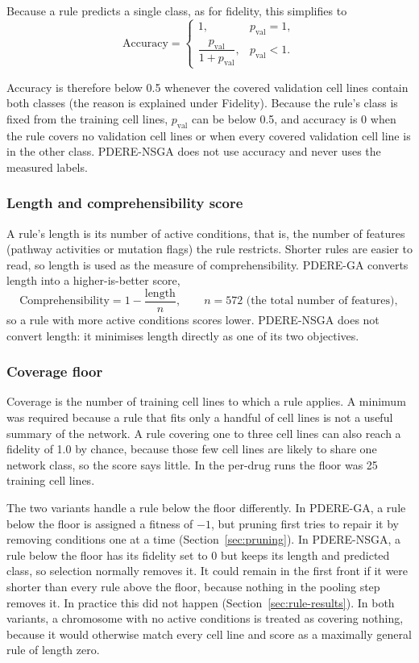 Because a rule predicts a single class, as for fidelity, this simplifies to
\[
  \text{Accuracy} =
  \begin{cases}
    1, & p_{\text{val}} = 1,\\[4pt]
    \dfrac{p_{\text{val}}}{1+p_{\text{val}}}, & p_{\text{val}} < 1.
  \end{cases}
\]

Accuracy is therefore below 0.5 whenever the covered validation cell lines contain both classes (the reason is explained under Fidelity). Because the rule's class is fixed from the training cell lines, $p_{\text{val}}$ can be below 0.5, and accuracy is 0 when the rule covers no validation cell lines or when every covered validation cell line is in the other class. PDERE-NSGA does not use accuracy and never uses the measured labels.

\subsubsection{Length and comprehensibility score}
\label{sec:length-measure}

A rule's length is its number of active conditions, that is, the number of features (pathway activities or mutation flags) the rule restricts. Shorter rules are easier to read, so length is used as the measure of comprehensibility. PDERE-GA converts length into a higher-is-better score,
\[
  \text{Comprehensibility} = 1 - \frac{\text{length}}{n}, \qquad n = 572 \text{ (the total number of features)},
\]
so a rule with more active conditions scores lower. PDERE-NSGA does not convert length: it minimises length directly as one of its two objectives.

\subsubsection{Coverage floor}
\label{sec:coverage-floor}

Coverage is the number of training cell lines to which a rule applies. A minimum was required because a rule that fits only a handful of cell lines is not a useful summary of the network. A rule covering one to three cell lines can also reach a fidelity of 1.0 by chance, because those few cell lines are likely to share one network class, so the score says little. In the per-drug runs the floor was 25 training cell lines.

The two variants handle a rule below the floor differently. In PDERE-GA, a rule below the floor is assigned a fitness of $-1$, but pruning first tries to repair it by removing conditions one at a time (Section~\ref{sec:pruning}). In PDERE-NSGA, a rule below the floor has its fidelity set to 0 but keeps its length and predicted class, so selection normally removes it. It could remain in the first front if it were shorter than every rule above the floor, because nothing in the pooling step removes it. In practice this did not happen (Section~\ref{sec:rule-results}). In both variants, a chromosome with no active conditions is treated as covering nothing, because it would otherwise match every cell line and score as a maximally general rule of length zero.

